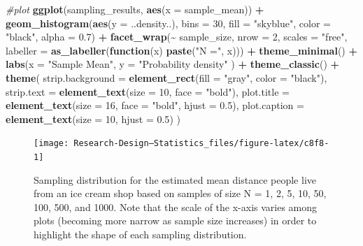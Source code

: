 \documentclass[
]{book}
\newenvironment{Shaded}{\begin{snugshade}}{\end{snugshade}}
\newcommand{\AttributeTok}[1]{\textcolor[rgb]{0.13,0.29,0.53}{#1}}
\newcommand{\CommentTok}[1]{\textcolor[rgb]{0.56,0.35,0.01}{\textit{#1}}}
\newcommand{\ControlFlowTok}[1]{\textcolor[rgb]{0.13,0.29,0.53}{\textbf{#1}}}
\newcommand{\DecValTok}[1]{\textcolor[rgb]{0.00,0.00,0.81}{#1}}
\newcommand{\FloatTok}[1]{\textcolor[rgb]{0.00,0.00,0.81}{#1}}
\newcommand{\FunctionTok}[1]{\textcolor[rgb]{0.13,0.29,0.53}{\textbf{#1}}}
\newcommand{\NormalTok}[1]{#1}
\newcommand{\SpecialCharTok}[1]{\textcolor[rgb]{0.81,0.36,0.00}{\textbf{#1}}}
\newcommand{\StringTok}[1]{\textcolor[rgb]{0.31,0.60,0.02}{#1}}
\begin{document}
\begin{Shaded}
\begin{Highlighting}[]
\CommentTok{\#plot}
\FunctionTok{ggplot}\NormalTok{(sampling\_results, }\FunctionTok{aes}\NormalTok{(}\AttributeTok{x =}\NormalTok{ sample\_mean)) }\SpecialCharTok{+}
  \FunctionTok{geom\_histogram}\NormalTok{(}\FunctionTok{aes}\NormalTok{(}\AttributeTok{y =}\NormalTok{ ..density..), }\AttributeTok{bins =} \DecValTok{30}\NormalTok{, }\AttributeTok{fill =} \StringTok{"skyblue"}\NormalTok{, }\AttributeTok{color =} \StringTok{"black"}\NormalTok{, }\AttributeTok{alpha =} \FloatTok{0.7}\NormalTok{) }\SpecialCharTok{+}
  \FunctionTok{facet\_wrap}\NormalTok{(}\SpecialCharTok{\textasciitilde{}}\NormalTok{ sample\_size, }\AttributeTok{nrow =} \DecValTok{2}\NormalTok{, }\AttributeTok{scales =} \StringTok{"free"}\NormalTok{,}
               \AttributeTok{labeller =} \FunctionTok{as\_labeller}\NormalTok{(}\ControlFlowTok{function}\NormalTok{(x) }\FunctionTok{paste}\NormalTok{(}\StringTok{"N ="}\NormalTok{, x))) }\SpecialCharTok{+}
  \FunctionTok{theme\_minimal}\NormalTok{() }\SpecialCharTok{+}
  \FunctionTok{labs}\NormalTok{(}\AttributeTok{x =} \StringTok{"Sample Mean"}\NormalTok{, }\AttributeTok{y =} \StringTok{"Probability density"}\NormalTok{ ) }\SpecialCharTok{+}
  \FunctionTok{theme\_classic}\NormalTok{() }\SpecialCharTok{+}
  \FunctionTok{theme}\NormalTok{(}
    \AttributeTok{strip.background =} \FunctionTok{element\_rect}\NormalTok{(}\AttributeTok{fill =} \StringTok{"gray"}\NormalTok{, }\AttributeTok{color =} \StringTok{"black"}\NormalTok{), }
    \AttributeTok{strip.text =} \FunctionTok{element\_text}\NormalTok{(}\AttributeTok{size =} \DecValTok{10}\NormalTok{, }\AttributeTok{face =} \StringTok{"bold"}\NormalTok{),}
    \AttributeTok{plot.title =} \FunctionTok{element\_text}\NormalTok{(}\AttributeTok{size =} \DecValTok{16}\NormalTok{, }\AttributeTok{face =} \StringTok{"bold"}\NormalTok{, }\AttributeTok{hjust =} \FloatTok{0.5}\NormalTok{),}
    \AttributeTok{plot.caption =} \FunctionTok{element\_text}\NormalTok{(}\AttributeTok{size =} \DecValTok{10}\NormalTok{, }\AttributeTok{hjust =} \FloatTok{0.5}\NormalTok{)}
\NormalTok{  )}
\end{Highlighting}
\end{Shaded}

\begin{figure}

{\centering \texttt{[image: Research-Design---Statistics\_files/figure-latex/c8f8-1]} 

}

\caption{Sampling distribution for the estimated mean distance people live from an ice cream shop based on samples of size N = 1, 2, 5, 10, 50, 100, 500, and 1000. Note that the scale of the x-axis varies among plots (becoming more narrow as sample size increases) in order to highlight the shape of each sampling distribution.}\label{fig:c8f8}
\end{figure}
\end{document}
